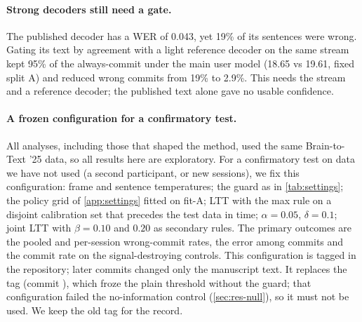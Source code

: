 \paragraph{Strong decoders still need a gate.} The published decoder has a WER of 0.043, yet 19\% of its sentences were wrong. Gating its text by agreement with a light reference decoder on the same stream kept 95\% of the always-commit \ewpm{} under the main user model (18.65 vs 19.61, fixed split A) and reduced wrong commits from 19\% to 2.9\%. This needs the stream and a reference decoder; the published text alone gave no usable confidence.

\paragraph{A frozen configuration for a confirmatory test.} All analyses, including those that shaped the method, used the same Brain-to-Text '25 data, so all results here are exploratory. For a confirmatory test on data we have not used (a second participant, or new sessions), we fix this configuration: frame and sentence temperatures; the guard as in \cref{tab:settings}; the policy grid of \cref{app:settings} fitted on fit-A; LTT with the max rule on a disjoint calibration set that precedes the test data in time; $\alpha = 0.05$, $\delta = 0.1$; joint LTT with $\beta = 0.10$ and $0.20$ as secondary rules. The primary outcomes are the pooled and per-session wrong-commit rates, the error among commits and the commit rate on the signal-destroying controls. This configuration is tagged  in the repository; later commits changed only the manuscript text. It replaces the tag  (commit ), which froze the plain threshold without the guard; that configuration failed the no-information control (\cref{sec:res-null}), so it must not be used. We keep the old tag for the record.
